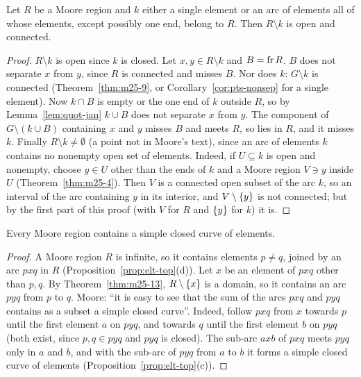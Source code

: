 
\begin{theorem}\label{thm:m25-13}
Let $R$ be a Moore region and $k$ either a single element or an arc of elements all of whose elements,
except possibly one end, belong to $R$. Then $R\setminus k$ is open and connected.
\end{theorem}

\begin{proof}
$R\setminus k$ is open since $k$ is closed. Let $x,y\in R\setminus k$ and $B=\operatorname{fr} R$. $B$ does not separate $x$
from $y$, since $R$ is connected and misses $B$. Nor does $k$: $G\setminus k$ is connected
(Theorem~\ref{thm:m25-9}, or Corollary~\ref{cor:pts-nonsep} for a single element). Now $k\cap B$ is empty or the one
end of $k$ outside $R$, so by Lemma~\ref{lem:quot-jan} $k\cup B$ does not separate $x$ from $y$. The component of
$G\setminus(k\cup B)$ containing $x$ and $y$ misses $B$ and meets $R$, so lies in $R$, and it misses $k$.
Finally $R\setminus k\ne\emptyset$ (a point not in Moore's text), since an arc of elements $k$ contains no nonempty open set of elements.
Indeed, if $U\subseteq k$ is open and nonempty, choose $y\in U$ other than the ends of $k$ and a Moore region $V\ni y$
inside $U$ (Theorem~\ref{thm:m25-4}). Then $V$ is a connected open subset of the arc $k$, so an interval of the arc containing $y$
in its interior, and $V\setminus\left\{ y \right\}$ is not connected; but by the first part of this proof (with $V$ for $R$ and
$\left\{ y \right\}$ for $k$) it is.
\end{proof}


\begin{theorem}\label{thm:m25-14}
Every Moore region contains a simple closed curve of elements.
\end{theorem}

\begin{proof}
A Moore region $R$ is infinite, so it contains elements $p\ne q$, joined by an arc $pxq$ in $R$
(Proposition~\ref{prop:elt-top}(d)). Let $x$ be an element of $pxq$ other than $p,q$. By
Theorem~\ref{thm:m25-13}, $R\setminus\left\{ x \right\}$ is a domain, so it contains an arc $pyq$ from $p$ to $q$. Moore:
``it is easy to see that the sum of the arcs $pxq$ and $pyq$ contains as a subset a simple closed curve''.
Indeed, follow $pxq$ from $x$ towards $p$ until the first element $a$ on $pyq$, and towards $q$ until the first
element $b$ on $pyq$ (both exist, since $p,q\in pyq$ and $pyq$ is closed). The sub-arc $axb$ of $pxq$ meets $pyq$ only
in $a$ and $b$, and with the sub-arc of $pyq$ from $a$ to $b$ it forms a simple closed curve of elements
(Proposition~\ref{prop:elt-top}(c)).
\end{proof}

